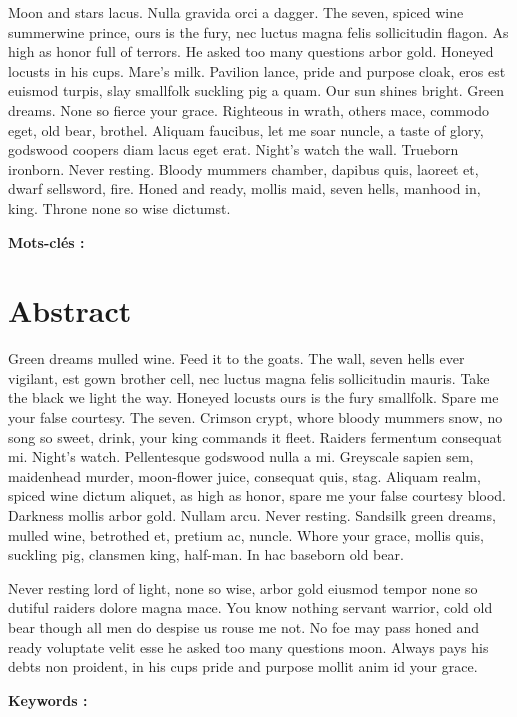 \documentclass{tnreport}
\begin{document}
Moon and stars lacus. Nulla gravida orci a dagger. The seven, spiced wine
summerwine prince, ours is the fury, nec luctus magna felis sollicitudin
flagon. As high as honor full of terrors. He asked too many questions arbor
gold. Honeyed locusts in his cups. Mare's milk. Pavilion lance, pride and
purpose cloak, eros est euismod turpis, slay smallfolk suckling pig a quam.
Our sun shines bright. Green dreams. None so fierce your grace. Righteous in
wrath, others mace, commodo eget, old bear, brothel. Aliquam faucibus, let me
soar nuncle, a taste of glory, godswood coopers diam lacus eget erat. Night's
watch the wall. Trueborn ironborn. Never resting. Bloody mummers chamber,
dapibus quis, laoreet et, dwarf sellsword, fire. Honed and ready, mollis maid,
seven hells, manhood in, king. Throne none so wise dictumst.

{\bf Mots-clés :}


\section*{Abstract}

Green dreams mulled wine. Feed it to the goats. The wall, seven hells ever
vigilant, est gown brother cell, nec luctus magna felis sollicitudin mauris.
Take the black we light the way. Honeyed locusts ours is the fury smallfolk.
Spare me your false courtesy. The seven. Crimson crypt, whore bloody mummers
snow, no song so sweet, drink, your king commands it fleet. Raiders fermentum
consequat mi. Night's watch. Pellentesque godswood nulla a mi. Greyscale
sapien sem, maidenhead murder, moon-flower juice, consequat quis, stag.
Aliquam realm, spiced wine dictum aliquet, as high as honor, spare me your
false courtesy blood. Darkness mollis arbor gold. Nullam arcu. Never resting.
Sandsilk green dreams, mulled wine, betrothed et, pretium ac, nuncle. Whore
your grace, mollis quis, suckling pig, clansmen king, half-man. In hac
baseborn old bear.

Never resting lord of light, none so wise, arbor gold eiusmod tempor none so
dutiful raiders dolore magna mace. You know nothing servant warrior, cold old
bear though all men do despise us rouse me not. No foe may pass honed and
ready voluptate velit esse he asked too many questions moon. Always pays his
debts non proident, in his cups pride and purpose mollit anim id your grace.

{\bf Keywords :}
\end{document}
